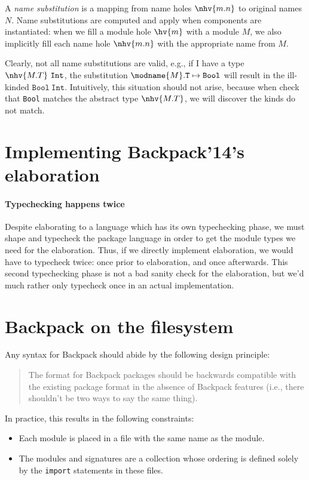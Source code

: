 A \emph{name substitution} is a mapping from name holes $\nhv{m.n}$ to
original names $N$.  Name substitutions are computed and apply when
components are instantiated: when we fill a module hole $\hv{m}$ with a
module $M$, we also implicitly fill each name hole $\nhv{m.n}$ with
the appropriate name from $M$.

Clearly, not all name substitutions are valid, e.g., if I have a type
$\nhv{M.T}~\mathtt{Int}$, the substitution $\modname{M}.\mathtt{T}
\mapsto \mathtt{Bool}$ will result in the ill-kinded
$\mathtt{Bool}~\mathtt{Int}$.  Intuitively, this situation should
not arise, because when check that \texttt{Bool} matches the abstract
type $\nhv{M.T}$, we will discover the kinds do not match.

\section{Implementing Backpack'14's elaboration}


\paragraph{Typechecking happens twice}
Despite elaborating to a language which has its own typechecking phase,
we must shape and typecheck the package language in order to get the
module types we need for the elaboration.  Thus, if we directly implement
elaboration, we would have to typecheck twice: once prior to
elaboration, and once afterwards.  This second typechecking
phase is not a bad sanity check for the elaboration, but we'd much
rather only typecheck once in an actual implementation.

\section{Backpack on the filesystem}

Any syntax for Backpack should abide by the following design
principle:

\begin{quote}
The format for Backpack packages should be backwards compatible with the
existing package format in the absence of Backpack features (i.e., there
shouldn't be two ways to say the same thing).
\end{quote}

\noindent
In practice, this results in the following constraints:

\begin{itemize}
    \item Each module is placed in a file with the same name
        as the module.
    \item The modules and signatures are a collection whose
        ordering is defined solely by the \verb|import| statements
        in these files.
\end{itemize}

